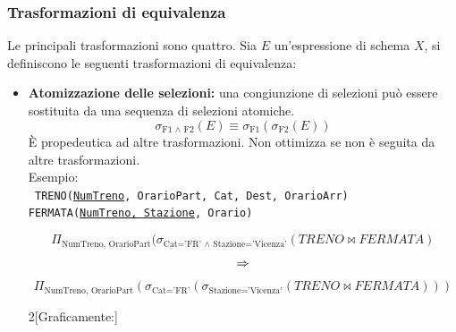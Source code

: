 \documentclass{report}
\begin{document}
\subsubsection{Trasformazioni di equivalenza}
Le principali trasformazioni sono quattro. Sia $E$ un'espressione di schema $X$, si definiscono le seguenti trasformazioni di equivalenza:
\begin{itemize}
    \item \textbf{Atomizzazione delle selezioni:} una congiunzione di selezioni può essere sostituita da una sequenza di selezioni atomiche.
\[ \sigma_\text{F1 $\wedge$ F2}(E) \equiv \sigma_\text{F1}(\sigma_\text{F2}(E))\] \`E propedeutica ad altre trasformazioni. Non ottimizza se non \`e seguita da altre trasformazioni. \\
Esempio:\\
\texttt{
TRENO(\underline{NumTreno}, OrarioPart, Cat, Dest, OrarioArr)\\
FERMATA(\underline{NumTreno, Stazione}, Orario)
}

\[ \Pi_{\text{NumTreno, OrarioPart}}(\sigma_{\text{Cat='FR' $\wedge$ Stazione='Vicenza'}}(TRENO \bowtie FERMATA) \]
\[ \Large \Rightarrow \]
\[ \Pi_{\text{NumTreno, OrarioPart}}(\sigma_{\text{Cat='FR'}}(\sigma_{\text{Stazione='Vicenza'}}(TRENO \bowtie FERMATA))) \]
\begin{multicols}{2}[Graficamente:]


\end{multicols}
\end{itemize}
\end{document}
